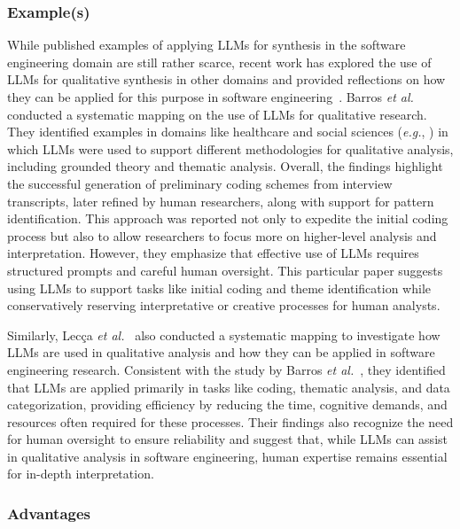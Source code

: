 \subsubsection{Example(s)} 

While published examples of applying LLMs for synthesis in the software engineering domain are still rather scarce, recent work has explored the use of LLMs for qualitative synthesis in other domains and provided reflections on how they can be applied for this purpose in software engineering~\cite{DBLP:journals/ase/BanoHZT24}. Barros \textit{et al.}~\cite{barros2024largelanguagemodelqualitative} conducted a systematic mapping on the use of LLMs for qualitative research. They identified examples in domains like healthcare and social sciences (\textit{e.g.}, \cite{de2024performing,mathis2024inductive}) in which LLMs were used to support different methodologies for qualitative analysis, including grounded theory and thematic analysis. Overall, the findings highlight the successful generation of preliminary coding schemes from interview transcripts, later refined by human researchers, along with support for pattern identification. This approach was reported not only to expedite the initial coding process but also to allow researchers to focus more on higher-level analysis and interpretation. However, they emphasize that effective use of LLMs requires structured prompts and careful human oversight. This particular paper suggests using LLMs to support tasks like initial coding and theme identification while conservatively reserving interpretative or creative processes for human analysts.

Similarly, Lecça \textit{et al.}~\cite{leça2024applicationsimplicationslargelanguage} also conducted a systematic mapping to investigate how LLMs are used in qualitative analysis and how they can be applied in software engineering research. Consistent with the study by Barros \textit{et al.}~\cite{barros2024largelanguagemodelqualitative}, they identified that LLMs are applied primarily in tasks like coding, thematic analysis, and data categorization, providing efficiency by reducing the time, cognitive demands, and resources often required for these processes. Their findings also recognize the need for human oversight to ensure reliability and suggest that, while LLMs can assist in qualitative analysis in software engineering, human expertise remains essential for in-depth interpretation.

\subsubsection{Advantages}


